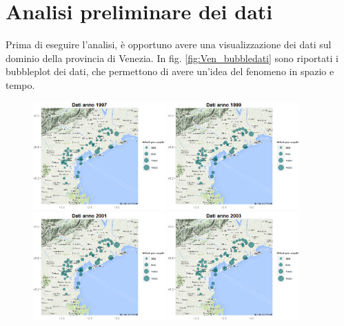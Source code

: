\documentclass[a4paper,11pt,twoside,openright]{book}							%
\begin{document}
\section{Analisi preliminare dei dati}
Prima di eseguire l'analisi, è opportuno avere una visualizzazione dei dati sul dominio della provincia di Venezia. In fig. \ref{fig:Ven_bubbledati} sono riportati i bubbleplot dei dati, che permettono di avere un'idea del fenomeno in spazio e tempo.
\newpage
\begin{figure}[H]
	\centering
	\includegraphics[trim=0cm 0cm 0cm 0cm,clip=true,width=0.45\textwidth]{Immagini/venezia_dati/Dati1997.png}
	\includegraphics[trim=0cm 0cm 0cm 0cm,clip=true,width=0.45\textwidth]{Immagini/venezia_dati/Dati1999.png}
	\includegraphics[trim=0cm 0cm 0cm 0cm,clip=true,width=0.45\textwidth]{Immagini/venezia_dati/Dati2001.png}
	\includegraphics[trim=0cm 0cm 0cm 0cm,clip=true,width=0.45\textwidth]{Immagini/venezia_dati/Dati2003.png}

\end{figure}
\end{document}
